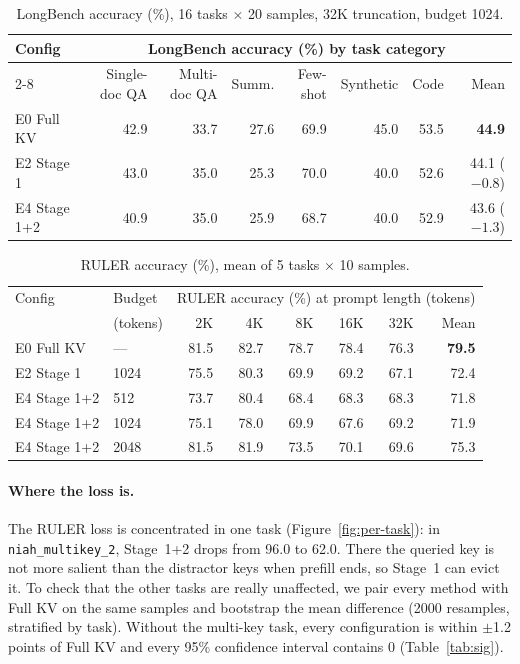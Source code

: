 \documentclass[10pt,letterpaper]{article}
\newcommand{\code}[1]{\texttt{#1}}
\newcommand{\best}[1]{\textbf{#1}}
\begin{document}
\begin{table}[h]
\centering\small
\caption{LongBench accuracy (\%), 16 tasks $\times$ 20 samples, 32K truncation, budget 1024.}
\label{tab:longbench}
\begin{tabular}{lrrrrrrr}
\toprule
Config & \multicolumn{7}{c}{LongBench accuracy (\%) by task category} \\
\cmidrule(l){2-8}
 & Single-doc QA & Multi-doc QA & Summ. & Few-shot & Synthetic & Code & Mean \\
\midrule
E0 Full KV & 42.9 & 33.7 & 27.6 & 69.9 & 45.0 & 53.5 & \best{44.9} \\
E2 Stage 1 & 43.0 & 35.0 & 25.3 & 70.0 & 40.0 & 52.6 & 44.1 ($-0.8$) \\
E4 Stage 1+2 & 40.9 & 35.0 & 25.9 & 68.7 & 40.0 & 52.9 & 43.6 ($-1.3$) \\
\bottomrule
\end{tabular}
\end{table}

\begin{table}[h]
\centering\small
\caption{RULER accuracy (\%), mean of 5 tasks $\times$ 10 samples.}
\label{tab:ruler}
\begin{tabular}{llrrrrrr}
\toprule
Config & Budget & \multicolumn{6}{c}{RULER accuracy (\%) at prompt length (tokens)} \\
 & (tokens) & 2K & 4K & 8K & 16K & 32K & Mean \\
\midrule
E0 Full KV & --- & 81.5 & 82.7 & 78.7 & 78.4 & 76.3 & \best{79.5} \\
E2 Stage 1 & 1024 & 75.5 & 80.3 & 69.9 & 69.2 & 67.1 & 72.4 \\
E4 Stage 1+2 & 512 & 73.7 & 80.4 & 68.4 & 68.3 & 68.3 & 71.8 \\
E4 Stage 1+2 & 1024 & 75.1 & 78.0 & 69.9 & 67.6 & 69.2 & 71.9 \\
E4 Stage 1+2 & 2048 & 81.5 & 81.9 & 73.5 & 70.1 & 69.6 & 75.3 \\
\bottomrule
\end{tabular}
\end{table}

\paragraph{Where the loss is.}
The RULER loss is concentrated in one task (Figure~\ref{fig:per-task}): in \code{niah\_multikey\_2}, Stage~1+2 drops from 96.0 to 62.0. There the queried key is not more salient than the distractor keys when prefill ends, so Stage~1 can evict it. To check that the other tasks are really unaffected, we pair every method with Full KV on the same samples and bootstrap the mean difference (2000 resamples, stratified by task). Without the multi-key task, every configuration is within $\pm$1.2 points of Full KV and every 95\% confidence interval contains 0 (Table~\ref{tab:sig}).
\end{document}
